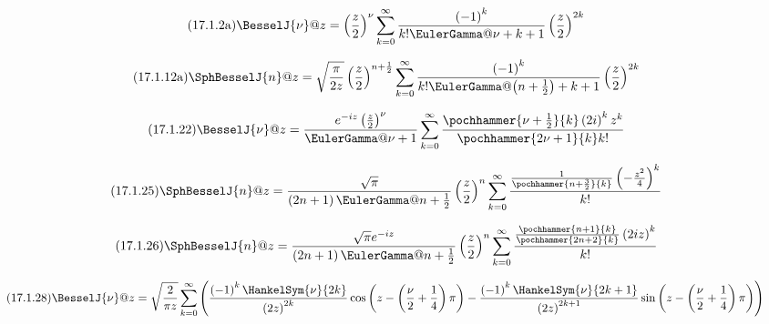 \documentclass[11pt]{article}
\begin{document}
\begin{equation*}\tag{17.1.2a}
  \BesselJ{\nu}@{z}
  = \left(\frac{z}{2}\right)^{\nu} \sum_{k=0}^\infty \frac{\left(-1\right)^{k}}{k!\EulerGamma@{\nu+k+1}}\left(\frac{z}{2}\right)^{2 k}
\end{equation*}

\begin{equation*}\tag{17.1.12a}
  \SphBesselJ{n}@{z}
  = \sqrt{\frac{\pi}{2 z}}\left(\frac{z}{2}\right)^{n+\frac{1}{2}} \sum_{k=0}^\infty \frac{\left(-1\right)^{k}}{k!\EulerGamma@{\left(n+\frac{1}{2}\right)+k+1}}\left(\frac{z}{2}\right)^{2 k}
\end{equation*}

\begin{equation*}\tag{17.1.22}
  \BesselJ{\nu}@{z}
  = \frac{e^{-i z}\left(\frac{z}{2}\right)^{\nu}}{\EulerGamma@{\nu+1}} \sum_{k=0}^\infty \frac{\pochhammer{\nu+\frac{1}{2}}{k}\left(2 i\right)^{k}z^{k}}{\pochhammer{2\nu+1}{k}k!}
\end{equation*}

\begin{equation*}\tag{17.1.25}
  \SphBesselJ{n}@{z}
  = \frac{\sqrt{\pi}}{\left(2 n+1\right)\EulerGamma@{n+\frac{1}{2}}}\left(\frac{z}{2}\right)^{n} \sum_{k=0}^\infty \frac{\frac{1}{\pochhammer{n+\frac{3}{2}}{k}}\left(-\frac{z^{2}}{4}\right)^{k}}{k!}
\end{equation*}

\begin{equation*}\tag{17.1.26}
  \SphBesselJ{n}@{z}
  = \frac{\sqrt{\pi}e^{-i z}}{\left(2 n+1\right)\EulerGamma@{n+\frac{1}{2}}}\left(\frac{z}{2}\right)^{n} \sum_{k=0}^\infty \frac{\frac{\pochhammer{n+1}{k}}{\pochhammer{2 n+2}{k}}\left(2 i z\right)^{k}}{k!}
\end{equation*}

\begin{equation*}\tag{17.1.28}
  \BesselJ{\nu}@{z}
  = \sqrt{\frac{2}{\pi z}} \sum_{k=0}^\infty \left(\frac{\left(-1\right)^{k}\HankelSym{\nu}{2 k}}{\left(2 z\right)^{2 k}}\cos\left(z-\left(\frac{\nu}{2}+\frac{1}{4}\right)\pi\right)-\frac{\left(-1\right)^{k}\HankelSym{\nu}{2 k+1}}{\left(2 z\right)^{2 k+1}}\sin\left(z-\left(\frac{\nu}{2}+\frac{1}{4}\right)\pi\right)\right)
\end{equation*}
\end{document}
